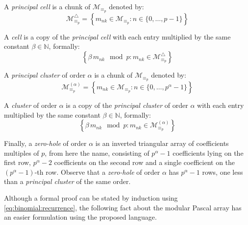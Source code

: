 A \emph{principal cell} is a chunk of $\mathcal{M}_{\equiv_{p}}$ denoted by:
\begin{displaymath}
    \mathcal{M}_{\equiv_{p}}^{\bigtriangleup} = 
        \left\lbrace m_{nk}\in \mathcal{M}_{\equiv_{p}}: n\in\lbrace 0,\ldots,p-1\rbrace\right\rbrace
\end{displaymath}

A \emph{cell} is a copy of the \emph{principal cell} with each entry multiplied 
by the same constant $\beta\in\mathbb{N}$, formally:
\begin{displaymath}
    \left\lbrace \beta\,m_{nk}\mod p:m_{nk}\in \mathcal{M}_{\equiv_{p}}^{\bigtriangleup}\right\rbrace
\end{displaymath}

A \emph{principal cluster} of order $\alpha$ is a chunk of $\mathcal{M}_{\equiv_{p}}$ denoted by:
\begin{displaymath}
    \mathcal{M}_{\equiv_{p}}^{(\alpha)} = 
        \left\lbrace m_{nk}\in \mathcal{M}_{\equiv_{p}}: n\in\lbrace 0,\ldots,p^{\alpha}-1\rbrace\right\rbrace
\end{displaymath}

A \emph{cluster} of order $\alpha$ is a copy of the \emph{principal cluster}
of order $\alpha$ with each entry multiplied 
by the same constant $\beta\in\mathbb{N}$, formally:
\begin{displaymath}
    \left\lbrace \beta\,m_{nk}\mod p:m_{nk}\in \mathcal{M}_{\equiv_{p}}^{(\alpha)}\right\rbrace
\end{displaymath}

Finally, a \emph{zero-hole} of order $\alpha$ is an inverted triangular array of
coefficients multiples of $p$, from here the name, consisting of $p^{\alpha}-1$
coefficients lying on the first row, $p^{\alpha}-2$ coefficients on the second row
and a single coefficient on the $(p^{\alpha}-1)$-th row. 
Observe that a \emph{zero-hole} of order $\alpha$ has $p^{\alpha}-1$ rows, one less
than a \emph{principal cluster} of the same order.

Although a formal proof can be stated by induction using
\autoref{eq:binomial:recurrence}, the following fact about the modular Pascal
array has an easier formulation using the proposed language.

